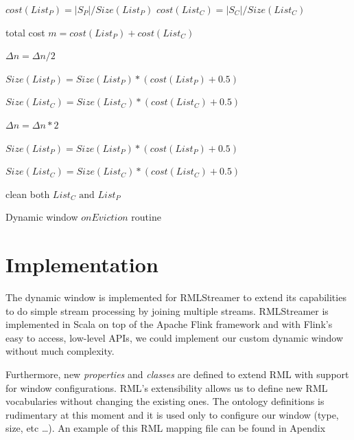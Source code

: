 \begin{algorithm}[htbp]
    \DontPrintSemicolon

    $cost(List_P) = |S_P| / Size(List_P)$       
    $cost(List_C) = |S_C| / Size(List_C)$       


    total cost $ m = cost(List_P) + cost(List_C)$  
  
    {
        $\Delta n = \Delta n / 2 $ 
        
        $Size(List_P) = Size(List_P) * (cost(List_P) + 0.5)$  

        $Size(List_C) = Size(List_C) * (cost(List_C) + 0.5)$  
    }
    {
        $\Delta n = \Delta n * 2$ 

        $Size(List_P) = Size(List_P) * (cost(List_P) + 0.5)$  

        $Size(List_C) = Size(List_C) * (cost(List_C) + 0.5)$  
    }

    clean both $List_C \text{ and } List_P$
    \caption{Dynamic window $onEviction$ routine}
    \label{alg:dynamic_eviction}
\end{algorithm}



\section{Implementation}%
\label{sec:Implementation}

The dynamic window is implemented for RMLStreamer 
to extend its capabilities to do simple stream processing by 
joining multiple streams. RMLStreamer is implemented in Scala 
on top of the Apache Flink framework and with Flink's easy to access, low-level APIs, 
we could implement our custom dynamic window without much complexity.  

Furthermore, new \emph{properties} and \emph{classes} are defined to extend RML with 
support for window configurations. RML's extensibility allows us to 
define new RML vocabularies without changing the existing ones. The ontology 
definitions is rudimentary at this moment and it is used only to configure our 
window (type, size, etc \dots). An example of this RML mapping file can 
be found in Apendix~








 




